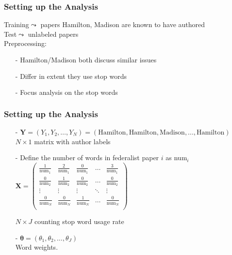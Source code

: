 \documentclass{beamer}
\numberwithin{equation}{section}
\begin{document}
\begin{frame}
\frametitle{Setting up the Analysis}


\alert{Training}$\leadsto$ papers Hamilton, Madison are known to have authored\\
\alert{Test}$\leadsto$ unlabeled papers\\
\alert{Preprocessing}:
\begin{itemize}
\item[-] Hamilton/Madison both discuss similar issues
\item[-] Differ in extent they use \alert{stop words}
\item[-] Focus analysis on the stop words
\end{itemize}


\end{frame}

\begin{frame}
\frametitle{Setting up the Analysis}

\begin{itemize}
\item[-] $\boldsymbol{Y} = (Y_{1}, Y_{2}, \hdots, Y_{N}) = (\text{Hamilton}, \text{Hamilton}, \text{Madison}, ..., \text{Hamilton})  $ \\ $N \times 1$ matrix with author labels
\item[-] Define the number of words in federalist paper $i$ as num$_{i}$
$\boldsymbol{X} = \begin{pmatrix}
\frac{1}{\text{num}_{1}}  & \frac{2}{\text{num}_{1}} & \frac{0}{\text{num}_{1}} & \hdots & \frac{3}{\text{num}_{1}}\\
\frac{0}{\text{num}_{2}} & \frac{1}{\text{num}_{2}} & \frac{0}{\text{num}_{2}} & \hdots & \frac{0}{\text{num}_{2}} \\
\vdots & \vdots & \vdots& \ddots & \vdots \\
\frac{0}{\text{num}_{N}} & \frac{0}{\text{num}_{N}} & \frac{1}{\text{num}_{N}} & \hdots & \frac{0}{\text{num}_{N}} \\
\end{pmatrix}$

 $N \times J$ counting stop word usage rate
\item[-] $\boldsymbol{\theta} = (\theta_{1}, \theta_{2}, \hdots, \theta_{J})$ \\ Word weights.\\
\end{itemize}





\end{frame}
\end{document}
